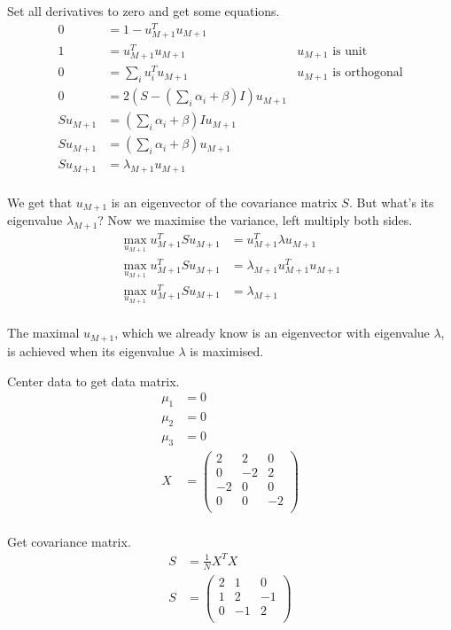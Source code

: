 \documentclass[newpage]{homework}
\begin{document}
Set all derivatives to zero and get some equations.
\begin{align*}
    0   &=  1 - u_{M+1}^T u_{M+1}   \\
    1   &=  u_{M+1}^T u_{M+1}   &\text{$u_{M+1}$ is unit} \\
    0    &= \sum_i u_i^T u_{M+1}    &\text{$u_{M+1}$ is orthogonal} \\
    0	&=	2(S - (\sum_i \alpha_i + \beta)I)u_{M+1}   \\
    Su_{M+1}    &=	(\sum_i \alpha_i + \beta)Iu_{M+1}   \\
    Su_{M+1}    &=	(\sum_i \alpha_i + \beta)u_{M+1}   \\
    Su_{M+1}    &=	\lambda_{M+1} u_{M+1}   \\
\end{align*}

We get that $u_{M+1}$ is an eigenvector of the covariance matrix $S$. But what's its eigenvalue $\lambda_{M+1}$? Now we maximise the variance, left multiply both sides.
\begin{align*}
    \max_{u_{M+1}} u_{M+1}^T Su_{M+1}    &=	u_{M+1}^T \lambda u_{M+1}   \\
    \max_{u_{M+1}} u_{M+1}^T Su_{M+1}    &=	\lambda_{M+1} u_{M+1}^T u_{M+1}   \\
    \max_{u_{M+1}} u_{M+1}^T Su_{M+1}    &=	\lambda_{M+1} \\
\end{align*}

The maximal $u_{M+1}$, which we already know is an eigenvector with eigenvalue $\lambda$, is achieved when its eigenvalue $\lambda$ is maximised.


\question
Center data to get data matrix.
\begin{align*}
    \mu_1    &=	0	\\
    \mu_2    &=	0	\\
    \mu_3    &=	0	\\
    X   &=  \begin{pmatrix}
            2 & 2 & 0   \\
            0 & -2 & 2  \\
            -2 & 0 & 0  \\
            0 & 0 & -2  \\
            \end{pmatrix}   \\
\end{align*}

Get covariance matrix.
\begin{align*}
    S	&=	\frac{1}{N} X^T X	\\
    S   &=  \begin{pmatrix}
        2 & 1 & 0   \\
        1 & 2 & -1  \\
        0 & -1 & 2  \\
        \end{pmatrix}   \\
\end{align*}
\end{document}
